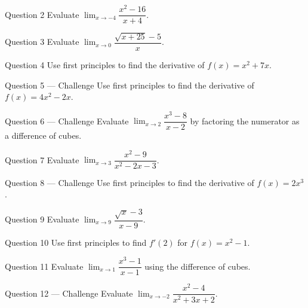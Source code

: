 \documentclass[11pt]{article}
\begin{document}
\begin{qbox}{Question 2}
Evaluate $\displaystyle\lim_{x\to-4}\dfrac{x^2-16}{x+4}$.\workspace{2.4cm}
\end{qbox}

\begin{qbox}{Question 3}
Evaluate $\displaystyle\lim_{x\to0}\dfrac{\sqrt{x+25}-5}{x}$.\workspace{2.4cm}
\end{qbox}

\begin{qbox}{Question 4}
Use first principles to find the derivative of $f(x)=x^2+7x$.\workspace{2.4cm}
\end{qbox}

\begin{qbox}{Question 5 --- Challenge}
Use first principles to find the derivative of $f(x)=4x^2-2x$.\workspace{3.4cm}
\end{qbox}

\begin{qbox}{Question 6 --- Challenge}
Evaluate $\displaystyle\lim_{x\to2}\dfrac{x^3-8}{x-2}$ by factoring the numerator as a difference of cubes.\workspace{3cm}
\end{qbox}

\begin{qbox}{Question 7}
Evaluate $\displaystyle\lim_{x\to3}\dfrac{x^2-9}{x^2-2x-3}$.\workspace{2.4cm}
\end{qbox}

\begin{qbox}{Question 8 --- Challenge}
Use first principles to find the derivative of $f(x)=2x^3$.\workspace{3.4cm}
\end{qbox}

\begin{qbox}{Question 9}
Evaluate $\displaystyle\lim_{x\to9}\dfrac{\sqrt x-3}{x-9}$.\workspace{2.4cm}
\end{qbox}

\begin{qbox}{Question 10}
Use first principles to find $f'(2)$ for $f(x)=x^2-1$.\workspace{2.4cm}
\end{qbox}

\begin{qbox}{Question 11}
Evaluate $\displaystyle\lim_{x\to1}\dfrac{x^3-1}{x-1}$ using the difference of cubes.\workspace{2.4cm}
\end{qbox}

\begin{qbox}{Question 12 --- Challenge}
Evaluate $\displaystyle\lim_{x\to-2}\dfrac{x^2-4}{x^2+3x+2}$.\workspace{3cm}
\end{qbox}
\end{document}
